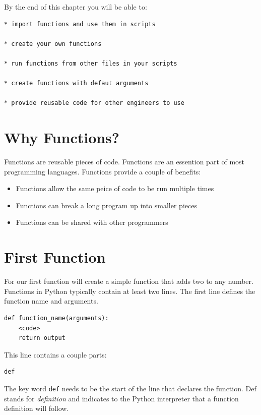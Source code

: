 \documentclass{book}
\begin{document}
    By the end of this chapter you will be able to:

\begin{lstlisting}
* import functions and use them in scripts

* create your own functions 

* run functions from other files in your scripts

* create functions with defaut arguments

* provide reusable code for other engineers to use
\end{lstlisting}

    \section{Why Functions?}\label{why-functions}

    Functions are reusable pieces of code. Functions are an essention part
of most programming languages. Functions provide a couple of benefits:

\begin{itemize}
\item
  Functions allow the same peice of code to be run multiple times
\item
  Functions can break a long program up into smaller pieces
\item
  Functions can be shared with other programmers
\end{itemize}

    \section{First Function}\label{first-function}

    For our first function will create a simple function that adds two to
any number. Functions in Python typically contain at least two lines.
The first line defines the function name and arguments.

\begin{lstlisting}
def function_name(arguments):
    <code>
    return output
\end{lstlisting}

This line contains a couple parts:

\begin{lstlisting}
def
\end{lstlisting}

The key word \lstinline!def! needs to be the start of the line that
declares the function. Def stands for \emph{definition} and indicates to
the Python interpreter that a function definition will follow.
\end{document}
